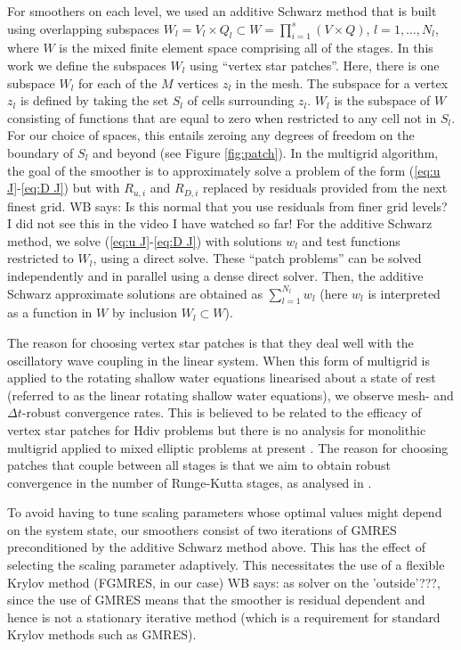 \documentclass[a4paper, 12pt]{article}
\newcommand{\werner}[1]{{\color{magenta}WB says: #1}}
\begin{document}
For smoothers on each level, we used an additive Schwarz method that
is built using overlapping subspaces $W_l=V_l\times Q_l \subset W =
\prod_{i=1}^s\left(V \times Q\right)$, $l=1,\ldots,N_l$, where $W$ is
the mixed finite element space comprising all of the stages.
In this work we define the subspaces $W_l$ using ``vertex
star patches''.
Here, there is one subspace $W_l$ for each of the $M$
vertices $z_l$ in the mesh.
The subspace for a vertex $z_l$ is defined by
taking the set $S_l$ of cells surrounding $z_l$. $W_l$ is the subspace
of $W$ consisting of functions that are equal to zero when restricted
to any cell not in $S_l$. For our choice of spaces, this entails
zeroing any degrees of freedom on the boundary of $S_l$ and beyond
(see Figure \ref{fig:patch}). In the multigrid algorithm, the goal of
the smoother is to approximately solve a problem of the form
(\ref{eq:u J}-\ref{eq:D J}) but with $R_{u,i}$ and $R_{D,i}$ replaced
by residuals provided from the next finest grid.
\werner{Is this normal that you use residuals from finer grid levels? I did not see this in the video I have watched so far!}
For the additive
Schwarz method, we solve (\ref{eq:u J}-\ref{eq:D J}) with solutions
$w_l$ and test functions restricted to $W_l$, using a direct
solve. These ``patch problems'' can be solved independently and in
parallel using a dense direct solver.  Then, the additive Schwarz
approximate solutions are obtained as $\sum_{l=1}^{N_l}w_l$ (here
$w_l$ is interpreted as a function in $W$ by inclusion $W_l\subset
W$).


The reason for choosing vertex star patches is that they deal well
with the oscillatory wave coupling in the linear system. When this
form of multigrid is applied to the rotating shallow water equations
linearised about a state of rest (referred to as the linear rotating
shallow water equations), we observe mesh- and $\Delta t$-robust
convergence rates.
This is believed to be related to the efficacy of
vertex star patches for Hdiv problems \citep{arnold2000multigrid} but
there is no analysis for monolithic multigrid applied to mixed
elliptic problems at present \citep{sm}. The reason for choosing patches
that couple between all stages is that we aim to obtain robust
convergence in the number of Runge-Kutta stages, as analysed in
\citep{kirby2024convergence}.

To avoid having to tune scaling parameters whose optimal values might
depend on the system state, our smoothers consist of two iterations of
GMRES preconditioned by the additive Schwarz method above. This has
the effect of selecting the scaling parameter adaptively.  This
necessitates the use of a flexible Krylov method (FGMRES, in our
case) \werner{as solver on the 'outside'???}, since the use of GMRES means that the smoother is residual
dependent and hence is not a stationary iterative method (which is a
requirement for standard Krylov methods such as GMRES).
\end{document}
